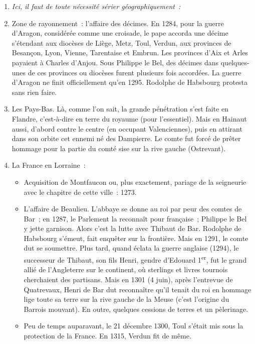 \documentclass[french,twoside]{book} %
\newlength{\listmod}
\newcommand{\listhead}[1]{\hspace{-1\listmod}\emph{#1}}
\begin{document}
\begin{enumerate}[itemsep=\baselineskip,]
\item[]\listhead{Ici, il faut de toute nécessité sérier géographiquement :}
\item Zone de rayonnement : l’affaire des décimes. En 1284, pour la guerre d’Aragon, considérée comme une croisade, le pape accorda une décime s’étendant aux diocèses de Liège, Metz, Toul, Verdun, aux provinces de Besançon, Lyon, Vienne, Tarentaise et Embrun. Les provinces d’Aix et Arles payaient à Charles d’Anjou. Sous Philippe le Bel, des décimes dans quelques-unes de ces provinces ou diocèses furent plusieurs fois accordées. La guerre d’Aragon ne finit officiellement qu’en 1295. Rodolphe de Habsbourg protesta sans rien faire.
\item Les Pays-Bas. Là, comme l’on sait, la grande pénétration s’est faite en Flandre, c’est-à-dire en terre du royaume (pour l’essentiel). Mais en Hainaut aussi, d’abord contre le centre (en occupant Valenciennes), puis en attirant dans son orbite cet ennemi né des Dampierre. Le comte fut forcé de prêter hommage pour la partie du comté sise sur la rive gauche (Ostrevant).
\item La France en Lorraine : 
\begin{itemize}[itemsep=0pt,]
\item Acquisition de Montfaucon ou, plus exactement, pariage de la seigneurie avec le chapitre de cette ville : 1273.
\item L’affaire de Beaulieu. L’abbaye se donne au roi par peur des comtes de Bar ; en 1287, le Parlement la reconnaît pour française ; Philippe le Bel y jette garnison. Alors c’est la lutte avec Thibaut de Bar. Rodolphe de Habsbourg s’émeut, fait enquêter sur la frontière. Mais en 1291, le comte dut se soumettre. Plus tard, quand éclata la guerre anglaise (1294), le successeur de Thibaut,  
\label{p34} son fils Henri, gendre d’Edouard 1\textsuperscript{er}, fut le grand allié de l’Angleterre sur le continent, où sterlings et livres tournois cherchaient des partisans. Mais en 1301 (4 juin), après l’entrevue de Quatrevaux, Henri de Bar dut reconnaître qu’il tenait du roi en hommage lige toute sa terre sur la rive gauche de la Meuse (c’est l’origine du Barrois mouvant). En outre, quelques cessions de terres et un pèlerinage.
\item Peu de temps auparavant, le 21 décembre 1300, Toul s’était mis sous la protection de la France. En 1315, Verdun fit de même.
\end{itemize}


\end{enumerate}
\end{document}
